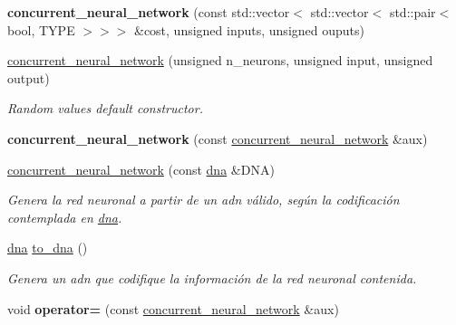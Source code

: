 \begin{DoxyCompactItemize}
\item 
\mbox{\label{classconcurrent__neural__network_a3380e6a7b4575fd5131c5af31c8bbaf1}} 
{\bfseries concurrent\+\_\+neural\+\_\+network} (const std\+::vector$<$ std\+::vector$<$ std\+::pair$<$ bool, T\+Y\+PE $>$$>$$>$ \&cost, unsigned inputs, unsigned ouputs)
\item 
\mbox{\hyperlink{classconcurrent__neural__network_ae6b889b695e5959b4265653235d54971}{concurrent\+\_\+neural\+\_\+network}} (unsigned n\+\_\+neurons, unsigned input, unsigned output)
\begin{DoxyCompactList}\small\item\em Random values default constructor. \end{DoxyCompactList}\item 
\mbox{\label{classconcurrent__neural__network_ac3e8b9ff79be67ed0a102bc4b05bbb86}} 
{\bfseries concurrent\+\_\+neural\+\_\+network} (const \mbox{\hyperlink{classconcurrent__neural__network}{concurrent\+\_\+neural\+\_\+network}} \&aux)
\item 
\mbox{\hyperlink{classconcurrent__neural__network_af59e6e4b876ebb11c7a41b42bed935de}{concurrent\+\_\+neural\+\_\+network}} (const \mbox{\hyperlink{structdna}{dna}} \&D\+NA)
\begin{DoxyCompactList}\small\item\em Genera la red neuronal a partir de un adn válido, según la codificación contemplada en \mbox{\hyperlink{structdna}{dna}}. \end{DoxyCompactList}\item 
\mbox{\hyperlink{structdna}{dna}} \mbox{\hyperlink{classconcurrent__neural__network_a1301ba2e3c5d21633df37d1ab6ae7bb8}{to\+\_\+dna}} ()
\begin{DoxyCompactList}\small\item\em Genera un adn que codifique la información de la red neuronal contenida. \end{DoxyCompactList}\item 
\mbox{\label{classconcurrent__neural__network_a6aceadc0feff8c47cec4423041096c97}} 
void {\bfseries operator=} (const \mbox{\hyperlink{classconcurrent__neural__network}{concurrent\+\_\+neural\+\_\+network}} \&aux)
\item 
\mbox{\label{classconcurrent__neural__network_a23841b7f99d68cde6242b1468e4e025d}} 

\end{DoxyCompactItemize}
